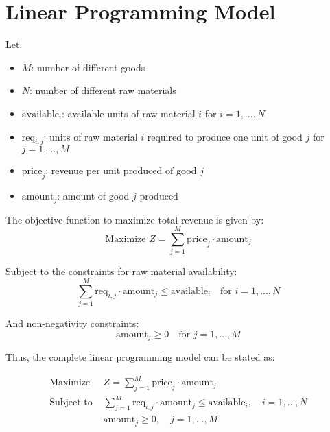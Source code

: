 \documentclass{article}
\begin{document}
\section*{Linear Programming Model}

Let:
\begin{itemize}
    \item \( M \): number of different goods
    \item \( N \): number of different raw materials
    \item \( \text{available}_i \): available units of raw material \( i \) for \( i = 1, \ldots, N \)
    \item \( \text{req}_{i,j} \): units of raw material \( i \) required to produce one unit of good \( j \) for \( j = 1, \ldots, M \)
    \item \( \text{price}_j \): revenue per unit produced of good \( j \)
    \item \( \text{amount}_j \): amount of good \( j \) produced
\end{itemize}

The objective function to maximize total revenue is given by:
\[
\text{Maximize } Z = \sum_{j=1}^{M} \text{price}_j \cdot \text{amount}_j
\]

Subject to the constraints for raw material availability:
\[
\sum_{j=1}^{M} \text{req}_{i,j} \cdot \text{amount}_j \leq \text{available}_i \quad \text{for } i = 1, \ldots, N
\]

And non-negativity constraints:
\[
\text{amount}_j \geq 0 \quad \text{for } j = 1, \ldots, M
\]

Thus, the complete linear programming model can be stated as:

\[
\begin{align*}
\text{Maximize } & Z = \sum_{j=1}^{M} \text{price}_j \cdot \text{amount}_j \\
\text{Subject to } & \sum_{j=1}^{M} \text{req}_{i,j} \cdot \text{amount}_j \leq \text{available}_i, \quad i = 1, \ldots, N \\
& \text{amount}_j \geq 0, \quad j = 1, \ldots, M
\end{align*}
\]
\end{document}
